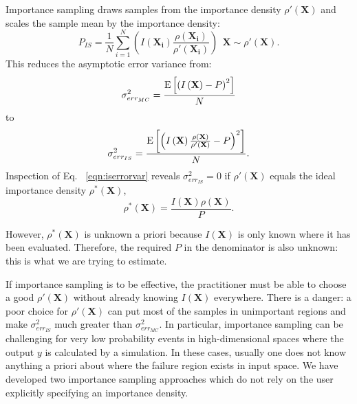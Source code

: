 Importance sampling draws samples from the importance density 
$\rho'\left(\textbf{X}\right)$ and scales the sample mean by the importance density:
\begin{equation}
P_{IS}=\frac{1}{N}\sum_{i=1}^N \left(I\left(\mathbf{X_i}\right)\frac{\rho\left(\mathbf{X_i}\right)}{\rho'\left(\mathbf{X_i}\right)}\right)\ \ \textbf{X}\sim\rho'\left(\textbf{X}\right).\label{eqn:ispfail}
\end{equation}
This reduces the asymptotic error variance from:
\begin{equation}
\sigma_{err_{MC}}^2=\frac{{\rm E}\left[\left(I\left(\textbf{X}\right)-P\right)^2\right]}{N}
\end{equation}
to
\begin{equation}
\sigma_{err_{IS}}^2=\frac{{\rm E}\left[\left(I\left(\textbf{X}\right)\frac{\rho\left(\textbf{X}\right)}{\rho'\left(\textbf{X}\right)}
-P\right)^2\right]}{N}.
\label{eqn:iserrorvar}
\end{equation}
Inspection of Eq. ~\ref{eqn:iserrorvar} reveals $\sigma_{err_{IS}}^2=0$ if
$\rho'\left(\textbf{X}\right)$ equals the ideal importance density
$\rho^*\left(\textbf{X}\right)$,
\begin{equation}
\rho^*\left(\textbf{X}\right)=\frac{I\left(\textbf{X}\right)\rho\left(\textbf{X}\right)}{P}.\end{equation}
 
However, $\rho^*\left(\textbf{X}\right)$ is unknown a priori because
$I\left(\textbf{X}\right)$ is only known where it has been evaluated.  
Therefore, the required $P$ in the denominator is also unknown:  this is what we are trying to estimate.
 
If importance sampling is to be effective, the practitioner must be able to
choose a good $\rho'\left(\textbf{X}\right)$ without already knowing
$I\left(\textbf{X}\right)$ everywhere.  
There is a danger: a poor choice for $\rho'\left(\textbf{X}\right)$ can put most of the samples in
unimportant regions and make $\sigma_{err_{IS}}^2$ much greater than
$\sigma_{err_{MC}}^2$.
In particular, importance sampling can be challenging for very low probability events in high-dimensional spaces where
the output $y$ is calculated by a simulation.  In these cases, usually one
does not know anything a priori about where the failure region exists
in input space.  
We have developed two importance sampling approaches which do not
rely on the user explicitly specifying an importance density.

